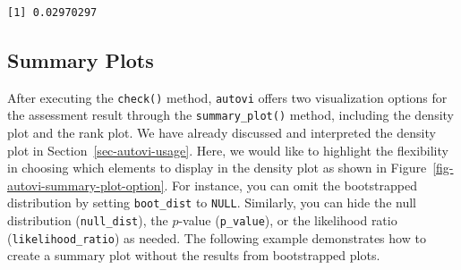 \documentclass[
doublespace,
  times]{anzsauth}
\newenvironment{Shaded}{\begin{snugshade}}{\end{snugshade}}
\newcommand{\AttributeTok}[1]{\textcolor[rgb]{0.40,0.45,0.13}{#1}}
\newcommand{\ConstantTok}[1]{\textcolor[rgb]{0.56,0.35,0.01}{#1}}
\newcommand{\DecValTok}[1]{\textcolor[rgb]{0.68,0.00,0.00}{#1}}
\newcommand{\FunctionTok}[1]{\textcolor[rgb]{0.28,0.35,0.67}{#1}}
\newcommand{\NormalTok}[1]{\textcolor[rgb]{0.00,0.23,0.31}{#1}}
\newcommand{\SpecialCharTok}[1]{\textcolor[rgb]{0.37,0.37,0.37}{#1}}
\begin{document}
\begin{Shaded}
\end{Shaded}

\begin{verbatim}
[1] 0.02970297
\end{verbatim}

\subsection{Summary Plots}\label{summary-plots}

After executing the \texttt{check()} method, \texttt{autovi} offers two
visualization options for the assessment result through the
\texttt{summary\_plot()} method, including the density plot and the rank
plot. We have already discussed and interpreted the density plot in
Section~\ref{sec-autovi-usage}. Here, we would like to highlight the
flexibility in choosing which elements to display in the density plot as
shown in Figure~\ref{fig-autovi-summary-plot-option}. For instance, you
can omit the bootstrapped distribution by setting \texttt{boot\_dist} to
\texttt{NULL}. Similarly, you can hide the null distribution
(\texttt{null\_dist}), the \(p\)-value (\texttt{p\_value}), or the
likelihood ratio (\texttt{likelihood\_ratio}) as needed. The following
example demonstrates how to create a summary plot without the results
from bootstrapped plots.

\begin{Shaded}
\end{Shaded}
\end{document}
